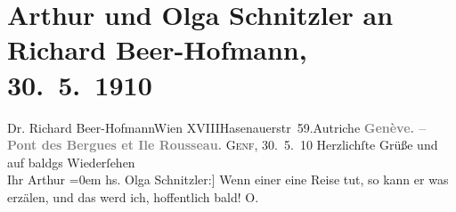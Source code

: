 

         
         \renewcommand{\erwaehntePersonen}{Personen: Richard Beer-Hofmann}
         \renewcommand{\erwaehnteOrte}{Orte: Genf, Hasenauerstraße, Pont des Bergues, Wien, XVIII., Währing, Île Rousseau, Österreich}
         \renewcommand{\erwaehnteWerke}{}
               \section[Arthur und Olga Schnitzler an Richard Beer-Hofmann, 30. 5. 1910]{ Arthur und Olga Schnitzler an Richard Beer-Hofmann, 30. 5. 1910}\nopagebreak{}\rehead{ }\begin{ledgroupsized}[t]{13cm}\normalsize\beginnumbering \toendnotes[C]{\smallbreak\pagebreak[2]} 
\pstart{}{\pb}Dr. Richard Beer-Hofmann\pend{}\pstart{}Wien XVIII\pend{}\pstart{}Hasenauerstr 59.\pend{}\pstart{}Autriche\pend{}{\bigskip}\pstart
           \noindent{}\centering{}{\pb}\textcolor{gray}{\textbf{Genève. – Pont des Bergues et Ile
                     Rousseau.}}\pend
           \pstart
           {\pb}\textsc{Genf}, 30. 5. 10\pend
           \pstart
           Herzlichſte Grüße und auf baldgs Wiederſehen{\\[\baselineskip]}Ihr \spacefill\mbox{Arthur}\pend
           \leftskip=0em{}\pstart
           \noindent{}{[}hs. Olga Schnitzler:{]} Wenn einer eine Reise tut, so kann er was erzälen, und
               das werd ich, hoffentlich bald!\pend
           \pstart \spacefill\mbox{O.}\pend{}
         
         \endnumbering{}\end{ledgroupsized}  \newcommand{\dateiname}{L01935}\newcommand{\titel}{Arthur und Olga Schnitzler an Richard Beer-Hofmann, 30. 5. 1910}\newcommand{\editorInnen}{Martin Anton Müller und Gerd-Hermann Susen}
      